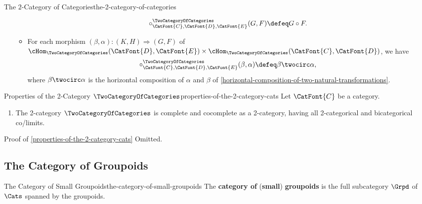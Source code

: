 \begin{definition}{The $2$-Category of Categories}{the-2-category-of-categories}
\begin{itemize}
\begin{itemize}
                    \[
                        \circ^{\TwoCategoryOfCategories}_{\CatFont{C},\CatFont{D},\CatFont{E}}(G,F)
                        \defeq
                        G\circ F.
                    \]%
                \item{}For each morphism $(\beta,\alpha)\colon(K,H)\Longrightarrow(G,F)$ of $\cHom_{\TwoCategoryOfCategories}(\CatFont{D},\CatFont{E})\times\cHom_{\TwoCategoryOfCategories}(\CatFont{C},\CatFont{D})$, we have
                    \[
                        \circ^{\TwoCategoryOfCategories}_{\CatFont{C},\CatFont{D},\CatFont{E}}(\beta,\alpha)
                        \defeq
                        \beta\twocirc\alpha,
                    \]%
                    where $\beta\twocirc\alpha$ is the horizontal composition of $\alpha$ and $\beta$ of \cref{horizontal-composition-of-two-natural-transformations}.
            \end{itemize}
    \end{itemize}
\end{definition}
\begin{proposition}{Properties of the 2-Category $\TwoCategoryOfCategories$}{properties-of-the-2-category-cats}%
    Let $\CatFont{C}$ be a category.
    \begin{enumerate}
        \item\label{properties-of-the-2-category-cats-co-completeness}The 2-category $\TwoCategoryOfCategories$ is complete and cocomplete as a 2-category, having all 2-categorical and bicategorical co/limits.%
    \end{enumerate}
\end{proposition}
\begin{Proof}{Proof of \cref{properties-of-the-2-category-cats}}%
    Omitted.
\end{Proof}
\subsection{The Category of Groupoids}\label{subsection-the-category-of-groupoids}
\begin{definition}{The Category of Small Groupoids}{the-category-of-small-groupoids}%
    The \textbf{category of} (\textbf{small}) \textbf{groupoids} is the full subcategory $\Grpd$ of $\Cats$ spanned by the groupoids.
\end{definition}
